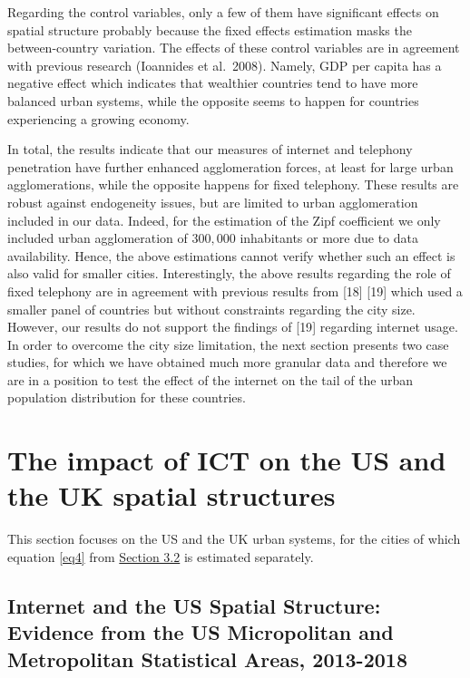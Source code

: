 \documentclass[10pt,letterpaper]{article}
\begin{document}
Regarding the control variables, only a few of them have significant
effects on spatial structure probably because the fixed effects
estimation masks the between-country variation. The effects of these
control variables are in agreement with previous research (Ioannides et
al.~2008). Namely, GDP per capita has a negative effect which indicates
that wealthier countries tend to have more balanced urban systems, while
the opposite seems to happen for countries experiencing a growing
economy.

In total, the results indicate that our measures of internet and
telephony penetration have further enhanced agglomeration forces, at
least for large urban agglomerations, while the opposite happens for
fixed telephony. These results are robust against endogeneity issues,
but are limited to urban agglomeration included in our data. Indeed, for
the estimation of the Zipf coefficient we only included urban
agglomeration of \(300,000\) inhabitants or more due to data
availability. Hence, the above estimations cannot verify whether such an
effect is also valid for smaller cities. Interestingly, the above
results regarding the role of fixed telephony are in agreement with
previous results from {[}18{]} {[}19{]} which used a smaller panel of
countries but without constraints regarding the city size. However, our
results do not support the findings of {[}19{]} regarding internet
usage. In order to overcome the city size limitation, the next section
presents two case studies, for which we have obtained much more granular
data and therefore we are in a position to test the effect of the
internet on the tail of the urban population distribution for these
countries.

\hypertarget{sec5}{%
\section{The impact of ICT on the US and the UK spatial
structures}\label{sec5}}

This section focuses on the US and the UK urban systems, for the cities
of which equation \ref{eq4} from \protect\hyperlink{sec3.2}{Section 3.2}
is estimated separately.

\hypertarget{sec5.1}{%
\subsection{Internet and the US Spatial Structure: Evidence from the US
Micropolitan and Metropolitan Statistical Areas,
2013-2018}\label{sec5.1}}
\end{document}
